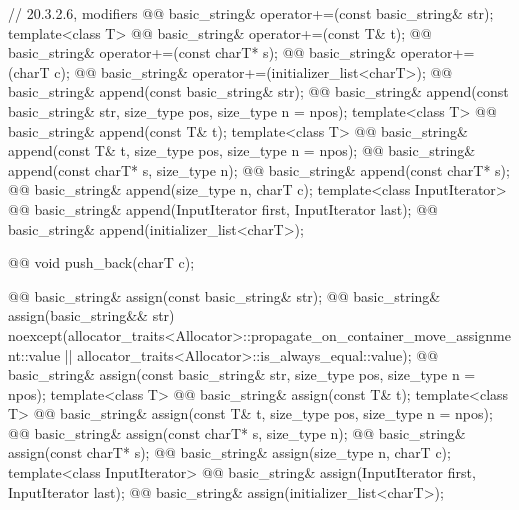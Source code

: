 \documentclass{wg21}
\begin{document}
\begin{codeblock}
{{    // 20.3.2.6, modifiers
    @@ basic_string& operator+=(const basic_string& str);
    template<class T>
      @@ basic_string& operator+=(const T& t);
    @@ basic_string& operator+=(const charT* s);
    @@ basic_string& operator+=(charT c);
    @@ basic_string& operator+=(initializer_list<charT>);
    @@ basic_string& append(const basic_string& str);
    @@ basic_string& append(const basic_string& str, size_type pos, size_type n = npos);
    template<class T>
      @@ basic_string& append(const T& t);
    template<class T>
      @@ basic_string& append(const T& t, size_type pos, size_type n = npos);
    @@ basic_string& append(const charT* s, size_type n);
    @@ basic_string& append(const charT* s);
    @@ basic_string& append(size_type n, charT c);
    template<class InputIterator>
      @@ basic_string& append(InputIterator first, InputIterator last);
    @@ basic_string& append(initializer_list<charT>);

    @@ void push_back(charT c);

    @@ basic_string& assign(const basic_string& str);
    @@ basic_string& assign(basic_string&& str)
      noexcept(allocator_traits<Allocator>::propagate_on_container_move_assignment::value ||
               allocator_traits<Allocator>::is_always_equal::value);
    @@ basic_string& assign(const basic_string& str, size_type pos, size_type n = npos);
    template<class T>
      @@ basic_string& assign(const T& t);
    template<class T>
      @@ basic_string& assign(const T& t, size_type pos, size_type n = npos);
    @@ basic_string& assign(const charT* s, size_type n);
    @@ basic_string& assign(const charT* s);
    @@ basic_string& assign(size_type n, charT c);
    template<class InputIterator>
      @@ basic_string& assign(InputIterator first, InputIterator last);
    @@ basic_string& assign(initializer_list<charT>);

}}
\end{codeblock}
\end{document}

